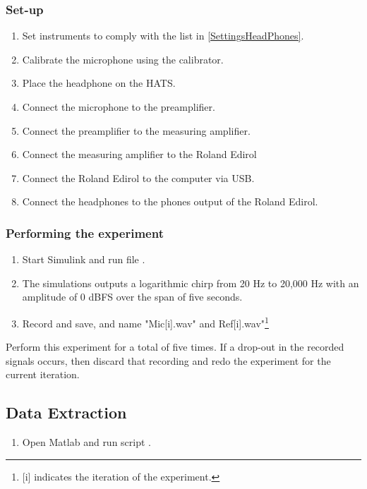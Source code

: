 \subsubsection{Set-up}
\begin{enumerate}
	\item Set instruments to comply with the list in \ref{SettingsHeadPhones}.
	\item Calibrate the microphone using the calibrator.
	\item Place the headphone on the HATS.
	\item Connect the microphone to the preamplifier. 
	\item Connect the preamplifier to the measuring amplifier.
	\item Connect the measuring amplifier to the Roland Edirol 
	\item Connect the Roland Edirol to the computer via USB.
	\item Connect the headphones to the phones output of the Roland Edirol.
\end{enumerate}

\subsubsection{Performing the experiment}
\begin{enumerate}
	\item Start Simulink and run file  .
	\item The simulations outputs a logarithmic chirp from 20 Hz to 20,000 Hz with an amplitude of 0 dBFS over the span of five seconds.
	\item Record and save, and name "Mic[i].wav" and Ref[i].wav"\footnote{[i] indicates the iteration of the experiment.}
\end{enumerate}
Perform this experiment for a total of five times.
If  a drop-out in the recorded signals occurs, then discard that recording and redo the experiment for the current iteration.

\subsection{Data Extraction}
\begin{enumerate}
	\item Open Matlab and run script .
\end{enumerate}

